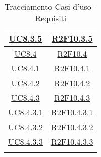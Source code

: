 \begin{longtable}{|c|c|}
	\hline
	\hyperlink{UC8.3.5}{UC8.3.5} & \hyperlink{R2F10.3.5}{R2F10.3.5}\\
	\hline
	\hyperlink{UC8.4}{UC8.4} & \hyperlink{R2F10.4}{R2F10.4}\\
	\hline
	\hyperlink{UC8.4.1}{UC8.4.1} & \hyperlink{R2F10.4.1}{R2F10.4.1}\\
	\hline
	\hyperlink{UC8.4.2}{UC8.4.2} & \hyperlink{R2F10.4.2}{R2F10.4.2}\\
	\hline
	\hyperlink{UC8.4.3}{UC8.4.3} & \hyperlink{R2F10.4.3}{R2F10.4.3}\\
	\hline
	\hyperlink{UC8.4.3.1}{UC8.4.3.1} & \hyperlink{R2F10.4.3.1}{R2F10.4.3.1}\\
	\hline
	\hyperlink{UC8.4.3.2}{UC8.4.3.2} & \hyperlink{R2F10.4.3.2}{R2F10.4.3.2}\\
	\hline
	\hyperlink{UC8.4.3.3}{UC8.4.3.3} & \hyperlink{R2F10.4.3.3}{R2F10.4.3.3}\\
	\hline
	\caption[Tracciamento Casi d'uso - Requisiti]{Tracciamento Casi d'uso - Requisiti}
	\label{tabella:requi-usecase}
\end{longtable}
\clearpage




